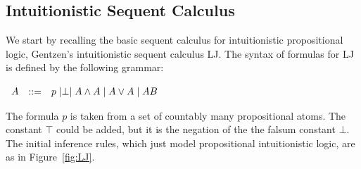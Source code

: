 \documentclass{article}
\let\to\relax
\newcommand{\to}{\rightarrow}
\begin{document}

\subsection{Intuitionistic Sequent Calculus}
We start by recalling the basic sequent calculus for intuitionistic propositional logic, 
Gentzen's intuitionistic sequent calculus LJ.  
The syntax of formulas for LJ is defined by the
following grammar:
\begin{center}
    \begin{math}
        \begin{array}{lllllllll}
            A & ::= & p \mid \perp \mid A \land A \mid A \lor A \mid A \to B
        \end{array}
    \end{math}
\end{center}
The formula $p$ is taken from a set of countably many  propositional atoms. The constant $\top$ could be added, but it is the negation of the the falsum constant $\bot$.
The  initial inference rules, which just model
propositional intuitionistic logic, are as in 
Figure~\ref{fig:LJ}.
\end{document}
